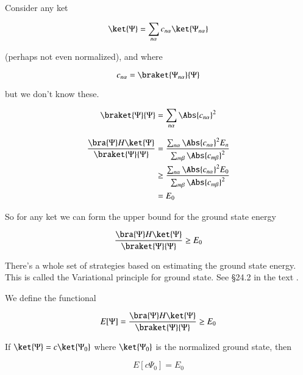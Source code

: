 Consider any ket

\begin{equation}\label{eqn:qmTwoL2:90}
\ket{\Psi} = \sum_{n \alpha} c_{n \alpha} \ket{\Psi_{n \alpha}}
\end{equation}

(perhaps not even normalized), and where

\begin{equation}\label{eqn:qmTwoL2:110}
c_{n \alpha} = \braket{\Psi_{n \alpha}}{\Psi}
\end{equation}

but we don't know these.

\begin{equation}\label{eqn:qmTwoL2:130}
\braket{\Psi}{\Psi} = \sum_{n \alpha} \Abs{c_{n \alpha}}^2
\end{equation}

\begin{align*}
\frac{
\bra{\Psi} H \ket{\Psi}
}{
\braket{\Psi}{\Psi}
}
&=
\frac{
\sum_{n \alpha} \Abs{c_{n \alpha}}^2 E_n
}{
\sum_{m \beta} \Abs{c_{m \beta}}^2
} \\
&\ge
\frac{
\sum_{n \alpha} \Abs{c_{n \alpha}}^2 E_0
}{
\sum_{m \beta} \Abs{c_{m \beta}}^2
}  \\
&=
E_0
\end{align*}

So for any ket we can form the upper bound for the ground state energy

\begin{equation}\label{eqn:qmTwoL2:150}
\frac{
\bra{\Psi} H \ket{\Psi}
}{
\braket{\Psi}{\Psi}
}
\ge E_0
\end{equation}

There's a whole set of strategies based on estimating the ground state energy.  This is called the Variational principle for ground state.  See \S 24.2 in the text \cite{desai2009quantum}.

We define the functional

\begin{equation}\label{eqn:qmTwoL2:170}
E[\Psi] =
\frac{
\bra{\Psi} H \ket{\Psi}
}{
\braket{\Psi}{\Psi}
}
\ge E_0
\end{equation}

If $\ket{\Psi} = c \ket{\Psi_0}$ where $\ket{\Psi_0}$ is the normalized ground state, then

\begin{equation}\label{eqn:qmTwoL2:190}
E[ c \Psi_0 ] = E_0
\end{equation}


